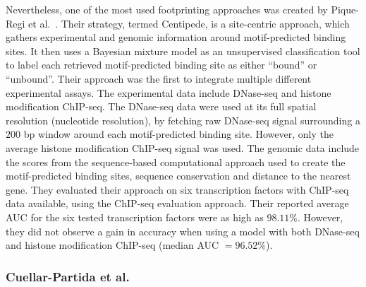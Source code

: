 Nevertheless, one of the most used footprinting approaches was created by Pique-Regi et al.~\cite{pique2011}. Their strategy, termed Centipede, is a site-centric approach, which gathers experimental and genomic information around motif-predicted binding sites. It then uses a Bayesian mixture model as an unsupervised classification tool to label each retrieved motif-predicted binding site as either ``bound'' or ``unbound''. Their approach was the first to integrate multiple different experimental assays. The experimental data include DNase-seq and histone modification ChIP-seq. The DNase-seq data were used at its full spatial resolution (nucleotide resolution), by fetching raw DNase-seq signal surrounding a $200$ bp window around each motif-predicted binding site. However, only the average histone modification ChIP-seq signal was used. The genomic data include the scores from the sequence-based computational approach used to create the motif-predicted binding sites, sequence conservation and distance to the nearest gene. They evaluated their approach on six transcription factors with ChIP-seq data available, using the ChIP-seq evaluation approach. Their reported average AUC for the six tested transcription factors were as high as $98.11\%$. However, they did not observe a gain in accuracy when using a model with both DNase-seq and histone modification ChIP-seq (median AUC $= 96.52\%$).

\subsubsection{Cuellar-Partida et al.}
\label{sec:cuellarpartida.2}

